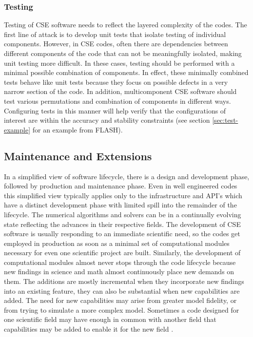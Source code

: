 \subsubsection{Testing}
\label{sec:testing}
Testing of CSE software needs to reflect the layered complexity of
the codes. The first line of attack is to develop 
unit tests that isolate testing of individual components. However, in
CSE codes, often there are dependencies between 
different components of the code that can not be meaningfully
isolated, making unit testing more difficult. In these cases, testing
should be performed with a minimal possible combination of components.  In
effect, these minimally combined tests behave like unit tests because they focus on possible
defects in a very narrow section of the code. In addition,
multicomponent CSE software should test various  permutations and
combination of components in different ways. Configuring tests in this
manner will help verify that the configurations of interest are within the
accuracy and stability constraints \cite{Dubey2015} (see section
\ref{sec:test-example} for an example from FLASH).   

\subsection{Maintenance and Extensions}
\label{sec:maintain}
In a simplified view of software lifecycle, there is a design and development phase,
followed by production and maintenance phase.  Even in well engineered
codes this simplified view typically applies only to the
infrastructure and API's which have a distinct development phase with
limited spill into the remainder of the lifecycle. The numerical 
algorithms and solvers can be in a continually evolving state
reflecting the advances in their respective fields.  
The development of CSE software is usually responding to an immediate
scientific need, so the codes get employed in production as soon as a
minimal set of computational modules necessary for even one scientific
project are built.  Similarly, the development of computational
modules almost never stops through the code lifecycle because new
findings in science and math almost continuously place new demands on
them. The additions are mostly incremental when they incorporate new
findings into an existing feature, they can also be substantial when
new capabilities are added. The need for new capabilities may arise
from  greater model fidelity, or from trying to simulate a more
complex model. Sometimes a code designed for one scientific field may
have enough in common with another field that capabilities may be
added to enable it for the new field \cite{Dubey2016}.    


